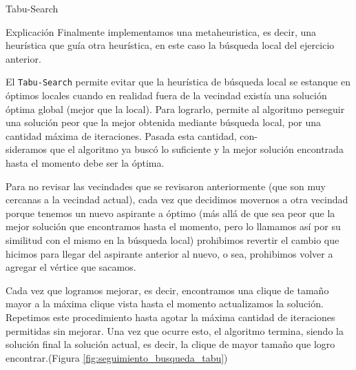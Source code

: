 \begin{section}{Tabu-Search}
	\begin{subsection}{Explicación}
		Finalmente implementamos una metaheuristica, es decir, una heurística que guía otra heurística, en este caso la búsqueda local del ejercicio anterior.

		El \texttt{Tabu-Search} permite evitar que la heurística de búsqueda local se estanque en óptimos locales cuando en realidad fuera de la vecindad existía una solución óptima global (mejor que la local).
		Para lograrlo, permite al algoritmo perseguir una solución peor que la mejor obtenida mediante búsqueda local, por una cantidad máxima de iteraciones.
		Pasada esta cantidad, con-\\sideramos que el algoritmo ya buscó lo suficiente y la mejor solución encontrada hasta el momento debe ser la óptima.

		Para no revisar las vecindades que se revisaron anteriormente (que son muy cercanas a la vecindad actual),
		cada vez que decidimos movernos a otra vecindad porque tenemos un nuevo aspirante a óptimo (más allá de que sea peor que la mejor solución que encontramos hasta el momento, pero lo llamamos así por su similitud con el mismo en la búsqueda local)
		prohibimos revertir el cambio que hicimos para llegar del aspirante anterior al nuevo, o sea, prohibimos volver a agregar el vértice que sacamos.
		
		Cada vez que logramos mejorar, es decir, encontramos una clique de tamaño mayor a la máxima clique vista hasta el momento actualizamos la solución.
		Repetimos este procedimiento hasta agotar la máxima cantidad de iteraciones permitidas sin mejorar. Una vez que ocurre esto, el algoritmo termina, siendo la solución final la solución actual, es decir, la clique de mayor tamaño que logro encontrar.(Figura \ref{fig:seguimiento_busqueda_tabu})


\end{subsection}
\end{section}
